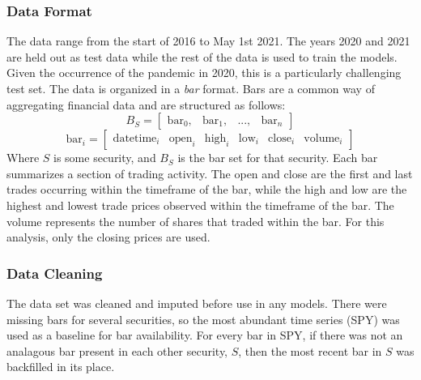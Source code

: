 \documentclass{article}
\begin{document}
\subsubsection{Data Format}
The data range from
the start of 2016 to May 1st 2021. The years 2020 and 2021 are held out as test data while the
rest of the data is used to train the models. Given the occurrence of the pandemic in 2020,
this is a particularly challenging test set. The data is organized in a \textit{bar} format.
Bars are a common way of aggregating financial data and are structured as follows:
$$B_{S} = \begin{bmatrix} \mathrm{bar}_0, & \mathrm{bar}_1, & 
    ..., & \mathrm{bar}_n \end{bmatrix}$$
$$\mathrm{bar}_i = \begin{bmatrix} \mathrm{datetime}_i & \mathrm{open}_i & 
    \mathrm{high}_i & \mathrm{low}_i & \mathrm{close}_i & \mathrm{volume}_i 
\end{bmatrix}$$
Where $S$ is some security, and $B_S$ is the bar set for that security. Each bar summarizes
a section of trading activity. The open and close are the first and last trades occurring within
the timeframe of the bar, while the high and low are the highest and lowest trade prices 
observed within the timeframe of the bar. The volume represents the number of shares that
traded within the bar. For this analysis, only the closing prices are used.
\subsubsection{Data Cleaning}
The data set was cleaned and imputed before use in any models. There were missing bars 
for several securities, so the most abundant time series (SPY) was used as a baseline for 
bar availability. For every bar in SPY, if there was not an analagous bar present in each 
other security, $S$, then the most recent bar in $S$ was backfilled in its place. 
\end{document}
